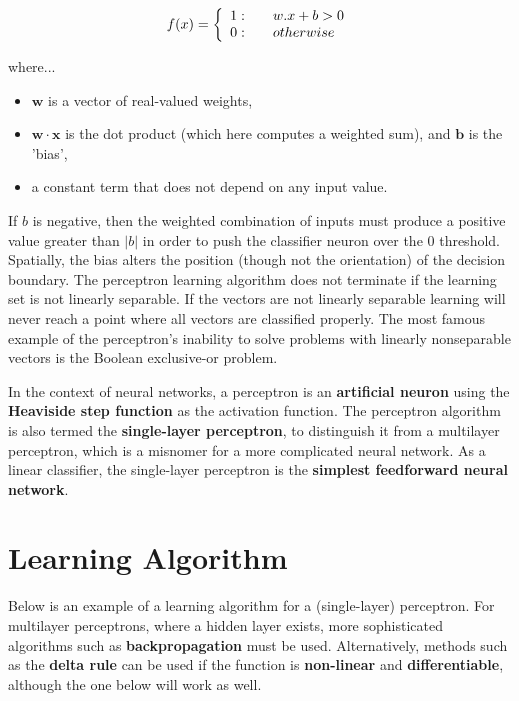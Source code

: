 \documentclass[12pt, right open]{memoir}
\begin{document}
\[ f(x) = \left\{ 
               \begin{array}{l l}
                1  : & \quad w.x+b > 0 \\
                0  : & \quad otherwise
               \end{array} 
       \right.
\]

where...
\begin{itemize}
\item $\mathbf{w}$ is a vector of real-valued weights, 
\item $\mathbf{w \cdot x}$ is the dot product (which here computes a weighted sum), and $\mathbf{b}$ is the 'bias', 
\item a constant term that does not depend on any input value.
\end{itemize}

If $b$ is negative, then the weighted combination of inputs must produce a positive value greater than $|b|$ in order to push the classifier neuron over the 0 threshold. Spatially, the bias alters the position (though not the orientation) of the decision boundary. The perceptron learning algorithm does not terminate if the learning set is not linearly separable. If the vectors are not linearly separable learning will never reach a point where all vectors are classified properly. The most famous example of the perceptron's inability to solve problems with linearly nonseparable vectors is the Boolean exclusive-or problem.

In the context of neural networks, a perceptron is an \textbf{artificial neuron} using the \textbf{Heaviside step function} as the activation function. The perceptron algorithm is also termed the \textbf{single-layer perceptron}, to distinguish it from a multilayer perceptron, which is a misnomer for a more complicated neural network. As a linear classifier, the single-layer perceptron is the \textbf{simplest feedforward neural network}.

\section{Learning Algorithm}
Below is an example of a learning algorithm for a (single-layer) perceptron. For multilayer perceptrons, where a hidden layer exists, more sophisticated algorithms such as \textbf{backpropagation} must be used. Alternatively, methods such as the \textbf{delta rule} can be used if the function is \textbf{non-linear} and \textbf{differentiable}, although the one below will work as well.
\end{document}
